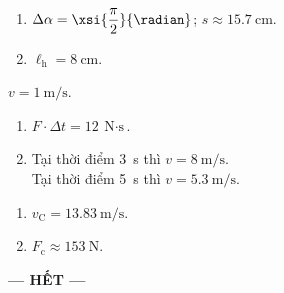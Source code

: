 \section{}
\setcounter{ex}{0}
\begin{ex}
	\begin{enumerate}[label=\alph*)]
		\item $\Delta\alpha=\xsi{\dfrac{\pi}{2}}{\radian}$; $s\approx\SI{15.7}{\centi\meter}$.
		\item $\ell_{\mathrm{h}}=\SI{8}{\centi\meter}$.
	\end{enumerate}
	\loigiai{
		
	}
\end{ex}
\begin{ex}
	$v=\SI{1}{\meter/\second}$.
	\loigiai{
		
	}
\end{ex}
\begin{ex}
	\begin{enumerate}[label=\alph*)]
		\item $F\cdot\Delta t=\SI{12}{\newton\cdot\second}$.
		\item Tại thời điểm \SI{3}{\second} thì $v=\SI{8}{\meter/\second}$.\\
		Tại thời điểm \SI{5}{\second} thì $v=\SI{5.3}{\meter/\second}$.
	\end{enumerate}
	\loigiai{
		
	}
\end{ex}
\begin{ex}
	\begin{enumerate}[label=\alph*)]
		\item $v_{\mathrm{C}}=\SI{13.83}{\meter/\second}$.
		\item $F_{\mathrm{c}}\approx\SI{153}{\newton}$.
	\end{enumerate}
	\loigiai{
		
	}
\end{ex}
\begin{center}
	\textbf{--- HẾT ---}
\end{center}